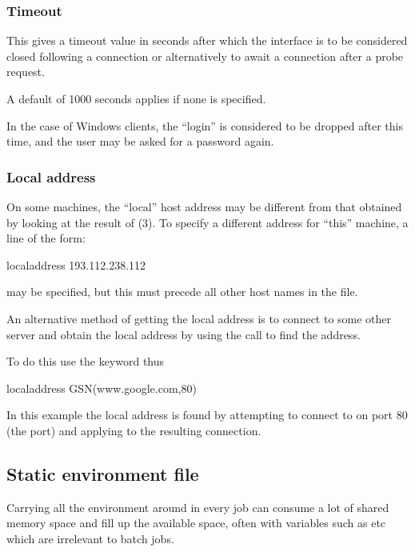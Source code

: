 \subsubsection{Timeout}
This gives a timeout value in seconds after which the interface is to be considered closed following a connection or alternatively to await a
connection after a probe request.

A default of 1000 seconds applies if none is specified.

In the case of Windows clients, the ``login'' is considered to be dropped after this time, and the user may be asked for a password again.

\subsubsection{Local address}
On some machines, the ``local'' host address may be different from that obtained by looking at the result of (3). To specify a different address for ``this'' machine, a line of the form:

\begin{expara}

localaddress 193.112.238.112

\end{expara}

may be specified,  but this must precede all other host names in the file.

An alternative method of getting the local address is to connect to some other server and obtain the local address by using the
 call to find the address.

To do this use the keyword  thus

\begin{expara}

localaddress GSN(www.google.com,80)

\end{expara}

In this example the local address is found by attempting to connect to  on port 80 (the  port) and
applying  to the resulting connection.

\subsection{Static environment file}
\label{Staticenv}
Carrying all the environment around in every job can consume a lot of shared memory space and fill up the available space, often with variables
such as  etc which are irrelevant to batch jobs.

